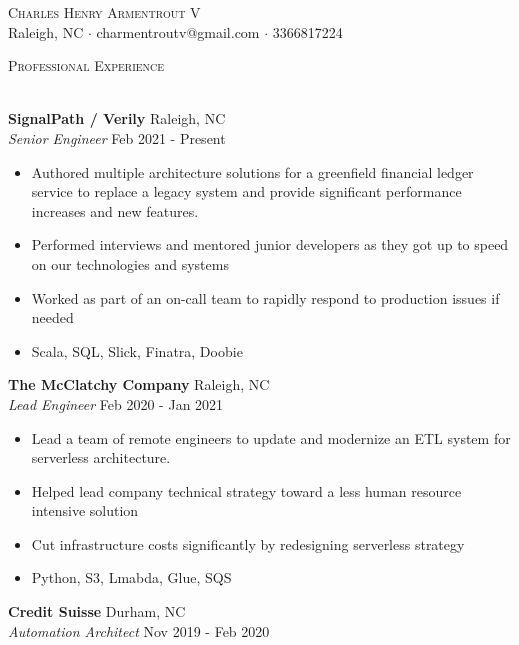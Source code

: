 \documentclass[a4paper]{article}
\newcommand{\lineunder} {
    \vspace*{-8pt} \\
    \hspace*{-18pt} \hrulefill \\
}
\newcommand{\header} [1] {
    {\hspace*{-18pt}\vspace*{6pt} \textsc{#1}}
    \vspace*{-6pt} \lineunder
}
\begin{document}
\vspace*{-40pt}

    

\vspace*{-10pt}
\begin{center}
	{\Huge \scshape {Charles Henry Armentrout V}}\\
	Raleigh, NC $\cdot$ charmentroutv@gmail.com $\cdot$ 3366817224\\
\end{center}

\header{Professional Experience}
\vspace{1mm}

\textbf{SignalPath / Verily} \hfill Raleigh, NC\\
\textit{Senior Engineer} \hfill Feb 2021 - Present\\
\vspace{-1mm}
\begin{itemize} \itemsep 1pt
	\item Authored multiple architecture solutions for a greenfield financial ledger service to replace a legacy system and provide significant performance increases and new features.
	\item Performed interviews and mentored junior developers as they got up to speed on our technologies and systems
	\item Worked as part of an on-call team to rapidly respond to production issues if needed
	\item Scala, SQL, Slick, Finatra, Doobie
\end{itemize}
\textbf{The McClatchy Company} \hfill Raleigh, NC\\
\textit{Lead Engineer} \hfill Feb 2020 - Jan 2021\\
\vspace{-1mm}
\begin{itemize} \itemsep 1pt
	\item Lead a team of remote engineers to update and modernize an ETL system for serverless architecture.
	\item Helped lead company technical strategy toward a less human resource intensive solution
	\item Cut infrastructure costs significantly by redesigning serverless strategy
	\item Python, S3, Lmabda, Glue, SQS
\end{itemize}
\textbf{Credit Suisse} \hfill Durham, NC\\
\textit{Automation Architect} \hfill Nov 2019 - Feb 2020\\
\end{document}
